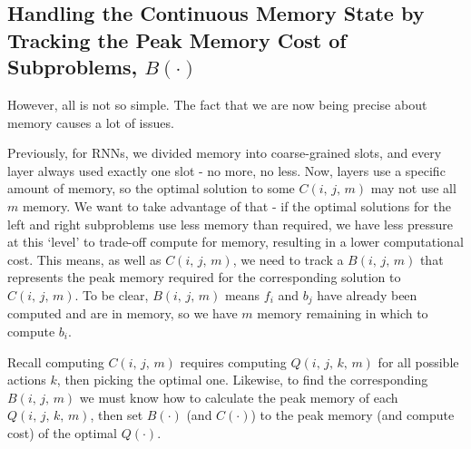 \subsection{Handling the Continuous Memory State by Tracking the Peak Memory Cost of Subproblems, \texorpdfstring{\(B(\cdot)\)}{\textit{B()}}}
However, all is not so simple.
The fact that we are now being precise about memory causes a lot of issues.

Previously, for RNNs, we divided memory into coarse-grained slots, and every layer always used exactly one slot - no more, no less.
Now, layers use a specific amount of memory, so the optimal solution to some \(C(i,\,j,\,m)\) may not use all \(m\) memory.
We want to take advantage of that - if the optimal solutions for the left and right subproblems use less memory than required, we have less pressure at this `level' to trade-off compute for memory, resulting in a lower computational cost.
This means, as well as \(C(i,\,j,\,m)\), we need to track a \(B(i,\,j,\,m)\) that represents the peak memory required for the corresponding solution to \(C(i,\,j,\,m)\).
To be clear, \(B(i,\,j,\,m)\) means \(f_i\) and \(b_j\) have already been computed and are in memory, so we have \(m\) memory remaining in which to compute \(b_i\).

Recall computing \(C(i,\,j,\,m)\) requires computing \(Q(i,\,j,\,k,\,m)\) for all possible actions \(k\), then picking the optimal one.
Likewise, to find the corresponding \(B(i,\,j,\,m)\) we must know how to calculate the peak memory of each \(Q(i,\,j,\,k,\,m)\), then set \(B(\cdot)\) (and \(C(\cdot)\)) to the peak memory (and compute cost) of the optimal \(Q(\cdot)\).

